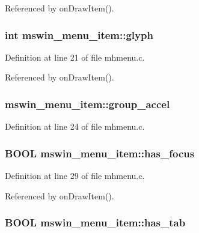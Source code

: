 Referenced by on\+Draw\+Item().

\hypertarget{structmswin__menu__item_a9184b47db8a12d06f5247a420a9ece34}{
\subsubsection[{glyph}]{\setlength{\rightskip}{0pt plus 5cm}int mswin\+\_\+menu\+\_\+item\+::glyph}}\label{structmswin__menu__item_a9184b47db8a12d06f5247a420a9ece34}


Definition at line 21 of file mhmenu.\+c.



Referenced by on\+Draw\+Item().

\hypertarget{structmswin__menu__item_a5bea5907e5c4306ea96e7fc784a82d73}{
\subsubsection[{group\+\_\+accel}]{ mswin\+\_\+menu\+\_\+item\+::group\+\_\+accel}}\label{structmswin__menu__item_a5bea5907e5c4306ea96e7fc784a82d73}


Definition at line 24 of file mhmenu.\+c.

\hypertarget{structmswin__menu__item_ab880fce63154e7b3be65441f1f11f1c8}{
\subsubsection[{has\+\_\+focus}]{\setlength{\rightskip}{0pt plus 5cm}B\+O\+O\+L mswin\+\_\+menu\+\_\+item\+::has\+\_\+focus}}\label{structmswin__menu__item_ab880fce63154e7b3be65441f1f11f1c8}


Definition at line 29 of file mhmenu.\+c.



Referenced by on\+Draw\+Item().

\hypertarget{structmswin__menu__item_ab310dbf6cbde678708f0b3de148470a8}{
\subsubsection[{has\+\_\+tab}]{\setlength{\rightskip}{0pt plus 5cm}B\+O\+O\+L mswin\+\_\+menu\+\_\+item\+::has\+\_\+tab}}\label{structmswin__menu__item_ab310dbf6cbde678708f0b3de148470a8}


